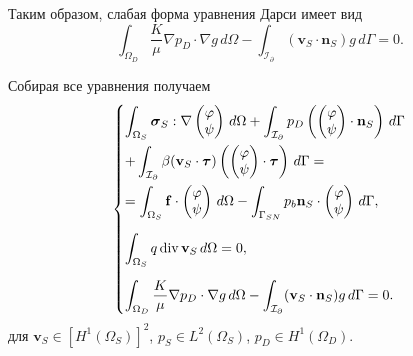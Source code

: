 \documentclass[a4paper,14pt]{extarticle}
\begin{document}
Таким образом, слабая форма уравнения Дарси имеет вид
\begin{equation}
	\int_{\Omega_D}
	\frac{K}{\mu}\nabla p_D\cdot\nabla g\,d\Omega
	-
	\int_{\mathcal I_\partial}
	(\mathbf v_S\cdot\mathbf n_S)g\,d\Gamma
	=
	0.
	\label{eq:darcy_weak_coupled}
\end{equation}


Собирая все уравнения получаем
\begin{equation}
	\begin{dcases}
		\int_{\Omega_S}
		\boldsymbol\sigma_S :
		\nabla
		\begin{pmatrix}
			\varphi\\
			\psi
		\end{pmatrix}
		\,d\Omega
		+
		\int_{\mathcal I_\partial}
		p_D
		\left(
			\begin{pmatrix}
				\varphi\\
				\psi
			\end{pmatrix}
			\cdot\mathbf n_S
		\right)
		\,d\Gamma
		\\
		+
		\int_{\mathcal I_\partial}
		\beta
		(\mathbf v_S\cdot\boldsymbol\tau)
		\left(
			\begin{pmatrix}
				\varphi\\
				\psi
			\end{pmatrix}
			\cdot\boldsymbol\tau
		\right)
		\,d\Gamma
		=
		\\
		=
		\int_{\Omega_S}
		\mathbf f\cdot
		\begin{pmatrix}
			\varphi\\
			\psi
		\end{pmatrix}
		\,d\Omega
		-
		\int_{\Gamma_{SN}}
		p_b\mathbf n_S\cdot
		\begin{pmatrix}
			\varphi\\
			\psi
		\end{pmatrix}
		\,d\Gamma,
		\\[6pt]
		\int_{\Omega_S}
		q\operatorname{div}\mathbf v_S\,d\Omega
		=
		0,
		\\[6pt]
		\int_{\Omega_D}
		\frac{K}{\mu}\nabla p_D\cdot\nabla g\,d\Omega
		-
		\int_{\mathcal I_\partial}
		(\mathbf v_S\cdot\mathbf n_S)g\,d\Gamma
		=
		0.
	\end{dcases}
	\label{eq:stokes_darcy_weak}
\end{equation}
для
$\mathbf v_S\in[H^1(\Omega_S)]^2$,
$p_S\in L^2(\Omega_S)$, 
$p_D\in H^1(\Omega_D)$.
\end{document}

